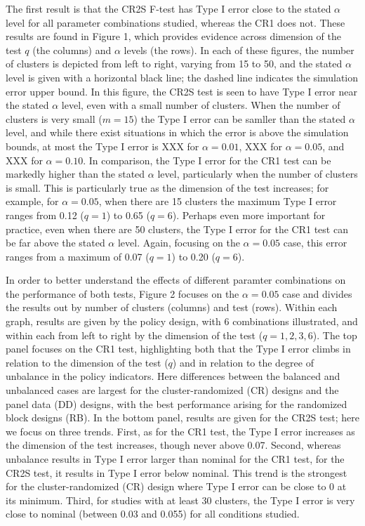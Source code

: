 \documentclass[12pt]{article}\usepackage[]{graphicx}\usepackage[]{color}
\begin{document}
The first result is that the CR2S F-test has Type I error close to the stated $\alpha$ level for all parameter combinations studied, whereas the CR1 does not. 
These results are found in Figure 1, which provides evidence across dimension of the test $q$ (the columns) and $\alpha$ levels (the rows). 
In each of these figures, the number of clusters is depicted from left to right, varying from 15 to 50, and the stated $\alpha$ level is given with a horizontal black line; the dashed line indicates the simulation error upper bound.
In this figure, the CR2S test is seen to have Type I error near the stated $\alpha$ level, even with a small number of clusters.
When the number of clusters is very small ($m = 15$) the Type I error can be samller than the stated $\alpha$ level, and while there exist situations in which the error is above the simulation bounds, at most the Type I error is XXX for $\alpha = 0.01$, XXX for $\alpha = 0.05$, and XXX for $\alpha = 0.10$.
In comparison, the Type I error for the CR1 test can be markedly higher than the stated $\alpha$ level, particularly when the number of clusters is small. 
This is particularly true as the dimension of the test increases; for example, for $\alpha = 0.05$, when there are 15 clusters the maximum Type I error ranges from 0.12 ($q = 1$) to 0.65 ($q = 6$).
Perhaps even more important for practice, even when there are 50 clusters, the Type I error for the CR1 test can be far above the stated $\alpha$ level.
Again, focusing on the $\alpha = 0.05$ case, this error ranges from a maximum of 0.07 ($q = 1$) to 0.20 ($q = 6$). 

In order to better understand the effects of different paramter combinations on the performance of both tests, Figure 2 focuses on the $\alpha = 0.05$ case and divides the results out by number of clusters (columns) and test (rows).
Within each graph, results are given by the policy design, with 6 combinations illustrated, and within each from left to right by the dimension of the test ($q = 1,2,3,6$).
The top panel focuses on the CR1 test, highlighting both that the Type I error climbs in relation to the dimension of the test ($q$) and in relation to the degree of unbalance in the policy indicators.
Here differences between the balanced and unbalanced cases are largest for the cluster-randomized (CR) designs and the panel data (DD) designs, with the best performance arising for the randomized block designs (RB).
In the bottom panel, results are given for the CR2S test; here we focus on three trends.
First, as for the CR1 test, the Type I error increases as the dimension of the test increases, though never above 0.07.
Second, whereas unbalance results in Type I error larger than nominal for the CR1 test, for the CR2S test, it results in Type I error below nominal. 
This trend is the strongest for the cluster-randomized (CR) design where Type I error can be close to 0 at its minimum. 
Third, for studies with at least 30 clusters, the Type I error is very close to nominal (between 0.03 and 0.055) for all conditions studied.
\end{document}
